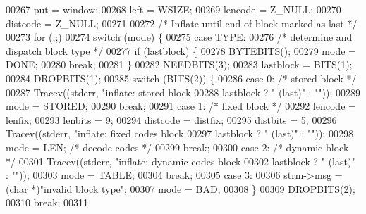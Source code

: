 \begin{DoxyCode}
{{{{00267     put = window;
00268     left = WSIZE;
00269     lencode = Z\_NULL;
00270     distcode = Z\_NULL;
00271 
00272     \textcolor{comment}{/* Inflate until end of block marked as last */}
00273     for (;;)
00274         \textcolor{keywordflow}{switch} (mode) \{
00275         \textcolor{keywordflow}{case} TYPE:
00276             \textcolor{comment}{/* determine and dispatch block type */}
00277             \textcolor{keywordflow}{if} (lastblock) \{
00278                 BYTEBITS();
00279                 mode = DONE;
00280                 \textcolor{keywordflow}{break};
00281             \}
00282             NEEDBITS(3);
00283             lastblock = BITS(1);
00284             DROPBITS(1);
00285             \textcolor{keywordflow}{switch} (BITS(2)) \{
00286             \textcolor{keywordflow}{case} 0:                             \textcolor{comment}{/* stored block */}
00287                 Tracev((stderr, \textcolor{stringliteral}{"inflate:     stored block%
00288                         lastblock ? \textcolor{stringliteral}{" (last)"} : \textcolor{stringliteral}{""}));
00289                 mode = STORED;
00290                 \textcolor{keywordflow}{break};
00291             \textcolor{keywordflow}{case} 1:                             \textcolor{comment}{/* fixed block */}
00292                 lencode = lenfix;
00293                 lenbits = 9;
00294                 distcode = distfix;
00295                 distbits = 5;
00296                 Tracev((stderr, \textcolor{stringliteral}{"inflate:     fixed codes block%
00297                         lastblock ? \textcolor{stringliteral}{" (last)"} : \textcolor{stringliteral}{""}));
00298                 mode = LEN;                     \textcolor{comment}{/* decode codes */}
00299                 \textcolor{keywordflow}{break};
00300             \textcolor{keywordflow}{case} 2:                             \textcolor{comment}{/* dynamic block */}
00301                 Tracev((stderr, \textcolor{stringliteral}{"inflate:     dynamic codes block%
00302                         lastblock ? \textcolor{stringliteral}{" (last)"} : \textcolor{stringliteral}{""}));
00303                 mode = TABLE;
00304                 \textcolor{keywordflow}{break};
00305             \textcolor{keywordflow}{case} 3:
00306                 strm->msg = (\textcolor{keywordtype}{char} *)\textcolor{stringliteral}{"invalid block type"};
00307                 mode = BAD;
00308             \}
00309             DROPBITS(2);
00310             \textcolor{keywordflow}{break};
00311 
}}}}}}}
\end{DoxyCode}
